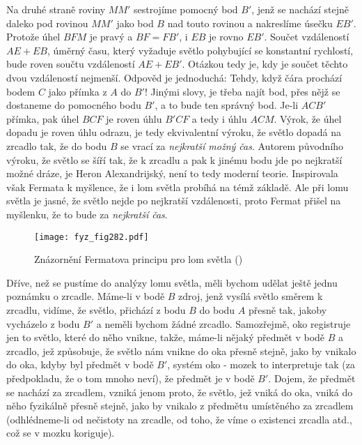 {    Na druhé straně roviny \(MM'\) sestrojíme pomocný bod \(B'\), jenž se nachází stejně daleko pod 
    rovinou \(MM'\) jako bod \(B\) nad touto rovinou a nakreslíme úsečku \(EB'\). Protože úhel 
    \(BFM\) je pravý a \(BF = FB'\), i \(EB\) je rovno \(EB'\). Součet vzdáleností \(AE + EB\), 
    úměrný času, který vyžaduje světlo pohybující se konstantní rychlostí, bude roven součtu 
    vzdáleností \(AE + EB'\). Otázkou tedy je, kdy je součet těchto dvou vzdáleností nejmenší. 
    Odpověd je jednoduchá: Tehdy, když čára prochází bodem \(C\) jako přímka z \(A\) do \(B'\)! 
    Jinými slovy, je třeba najít bod, přes nějž se dostaneme do pomocného bodu \(B'\), a to bude 
    ten správný bod. Je-li \(ACB'\) přímka, pak úhel \(BCF\) je roven úhlu \(B'CF\) a tedy i úhlu 
    \(ACM\). Výrok, že úhel dopadu je roven úhlu odrazu, je tedy ekvivalentní výroku, že světlo 
    dopadá na zrcadlo tak, že do bodu \(B\) se vrací za \emph{nejkratší možný čas}. Autorem 
    původního výroku, že světlo se šíří tak, že k zrcadlu a pak k jinému bodu jde po nejkratší 
    možné dráze, je Heron Alexandrijský, není to tedy moderní teorie. Inspirovala však Fermata k 
    myšlence, že i lom světla probíhá na témž základě. Ale při lomu světla je jasné, že světlo 
    nejde po nejkratší vzdálenosti, proto Fermat přišel na myšlenku, že to bude za \emph{nejkratší 
    čas}.
    
    \begin{figure}[ht!] %
      \centering
      \texttt{[image: fyz\_fig282.pdf]}
      \caption{Znázornění Fermatova principu pro lom světla
               (\cite[s.~348]{Feynman01})}
      \label{fyz:fig282}
    \end{figure}

    Dříve, než se pustíme do analýzy lomu světla, měli bychom udělat ještě jednu poznámku o 
    zrcadle. Máme-li v bodě \(B\) zdroj, jenž vysílá světlo směrem k zrcadlu, vidíme, že světlo, 
    přichází z bodu \(B\) do bodu \(A\) přesně tak, jakoby vycházelo z bodu \(B'\) a neměli bychom 
    žádné zrcadlo. Samozřejmě, oko registruje jen to světlo, které do něho vnikne, takže, máme-li 
    nějaký předmět v bodě \(B\) a zrcadlo, jež způsobuje, že světlo nám vnikne do oka přesně 
    stejně, jako by vnikalo do oka, kdyby byl předmět v bodě \(B'\), systém oko - mozek to 
    interpretuje tak (za předpokladu, že o tom mnoho neví), že předmět je v bodě \(B'\). Dojem, že 
    předmět se nachází za zrcadlem, vzniká jenom proto, že světlo, jež vniká do oka, vniká do něho 
    fyzikálně přesně stejně, jako by vnikalo z předmětu umístěného za zrcadlem (odhlédneme-li od 
    nečistoty na zrcadle, od toho, že víme o existenci zrcadla atd., což se v mozku koriguje).
    
}
